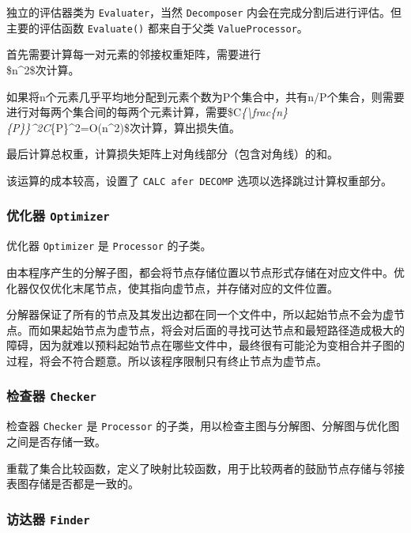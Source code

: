 \documentclass[
]{article}
\begin{document}
独立的评估器类为 \texttt{Evaluater}，当然 \texttt{Decomposer}
内会在完成分割后进行评估。但主要的评估函数 \texttt{Evaluate()}
都来自于父类 \texttt{ValueProcessor}。

首先需要计算每一对元素的邻接权重矩阵，需要进行\\
\$n\^{}2\$次计算。

如果将n个元素几乎平均地分配到元素个数为\textbar P\textbar 个集合中，共有n/\textbar P\textbar 个集合，则需要进行对每两个集合间的每两个元素计算，需要\$C\emph{\{\textbackslash frac\{n\}\{\textbar P\textbar\}\}\^{}2C}\{\textbar P\textbar\}\^{}2=O(n\^{}2)\$次计算，算出损失值。

最后计算总权重，计算损失矩阵上对角线部分（包含对角线）的和。

该运算的成本较高，设置了 \texttt{CALC\ afer\ DECOMP}
选项以选择跳过计算权重部分。

\hypertarget{header-n199}{%
\subsubsection{\texorpdfstring{优化器
\texttt{Optimizer}}{优化器 Optimizer}}\label{header-n199}}

优化器 \texttt{Optimizer} 是 \texttt{Processor} 的子类。

由本程序产生的分解子图，都会将节点存储位置以节点形式存储在对应文件中。优化器仅仅优化末尾节点，使其指向虚节点，并存储对应的文件位置。

分解器保证了所有的节点及其发出边都在同一个文件中，所以起始节点不会为虚节点。而如果起始节点为虚节点，将会对后面的寻找可达节点和最短路径造成极大的障碍，因为就难以预料起始节点在哪些文件中，最终很有可能沦为变相合并子图的过程，将会不符合题意。所以该程序限制只有终止节点为虚节点。

\hypertarget{header-n203}{%
\subsubsection{\texorpdfstring{检查器
\texttt{Checker}}{检查器 Checker}}\label{header-n203}}

检查器 \texttt{Checker} 是 \texttt{Processor}
的子类，用以检查主图与分解图、分解图与优化图之间是否存储一致。

重载了集合比较函数，定义了映射比较函数，用于比较两者的鼓励节点存储与邻接表图存储是否都是一致的。

\hypertarget{header-n206}{%
\subsubsection{\texorpdfstring{访达器
\texttt{Finder}}{访达器 Finder}}\label{header-n206}}
\end{document}
